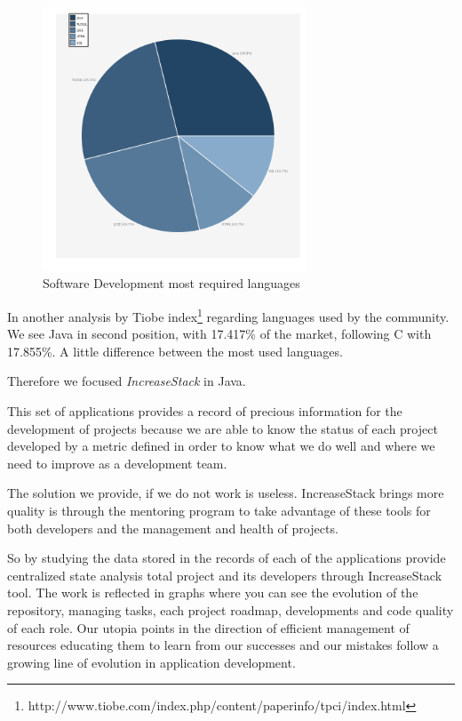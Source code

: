 \documentclass[11pt]{scrartcl}
\begin{document}
\begin{figure}[htp]
\begin{center}
  \includegraphics[width=0.7\textwidth]{images/requested-programming-language-piechart.png}
  \caption{Software Development most required languages}
  \label{fig:req-languages}
\end{center}
\end{figure}

\par In another analysis by Tiobe index\footnote{http://www.tiobe.com/index.php/content/paperinfo/tpci/index.html} regarding languages ​​used by the community. We see Java in second position, with 17.417\% of the market, following C with 17.855\%. A little difference between the most used languages.

\par Therefore we focused \emph{IncreaseStack} in Java.

\par This set of applications provides a record of precious information for the development of projects because we are able to know the status of each project developed by a metric defined in order to know what we do well and where we need to improve as a development team.

\par The solution we provide, if we do not work is useless. IncreaseStack brings more quality is through the mentoring program to take advantage of these tools for both developers and the management and health of projects.

\par So by studying the data stored in the records of each of the applications provide centralized state analysis total project and its developers through IncreaseStack tool. The work is reflected in graphs where you can see the evolution of the repository, managing tasks, each project roadmap, developments and code quality of each role. Our utopia points in the direction of efficient management of resources educating them to learn from our successes and our mistakes follow a growing line of evolution in application development.
\end{document}
